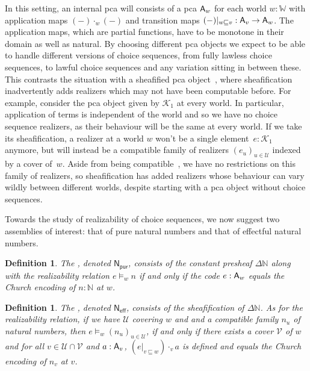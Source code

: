 \documentclass{easychair}
\newtheorem{defn}[thrm]{Definition}
\begin{document}
In this setting, an internal pca will consists of a pca \(\mathsf{A}_{w}\) for each
world \(w:\mathbb{W}\) with application maps \((-)\cdot_{w}(-)\) and transition
maps \((-)|_{w \sqsubseteq v} : \mathsf{A}_{v} \to \mathsf{A}_{w}\).
%
The application maps, which are partial functions, have to be monotone in their
domain as well as natural.
%
By choosing different pca objects we expect to be able to handle different
versions of choice sequences, from fully lawless choice sequences, to lawful
choice sequences and any variation sitting in between these.
%
This contrasts the situation with a sheafified pca
object~\cite{vanoostenSemanticalProofJonghs1991}, where sheafification
inadvertently adds realizers which may not have been computable before.
%
For example, consider the pca object given by \(\mathcal{K}_{1}\) at every
world.
%
In particular, application of terms is independent of the world and so we have
no choice sequence realizers, as their behaviour will be the same at every
world.
%
If we take its sheafification, a realizer at a world \(w\) won't be a single
element~\(e : \mathcal{K}_{1}\) anymore, but will instead be a compatible family
of realizers \({(e_{u})}_{u\in\mathcal{U}}\) indexed by a cover of~\(w\).
%
Aside from being compatible~\cite[Definition 2.1.2 in \S
C2.1]{johnstoneSketchesElephantTopos2002}, we have no restrictions on this
family of realizers, so sheafification has added realizers whose behaviour can
vary wildly between different worlds, despite starting with a pca object without
choice sequences.

Towards the study of realizability of choice sequences, we now suggest two
assemblies of interest: that of pure natural numbers and that of effectful
natural numbers.

\begin{defn}
  The , denoted
  \(\mathsf{N}_\mathsf{pur}\), consists of the constant presheaf
  \(\Delta\mathbb{N}\) along with the realizability relation \(e \vDash_{w} n\)
  if and only if the code \(e : \mathsf{A}_{w}\) equals the Church encoding of
  \(n : \mathbb{N}\) at \(w\).
\end{defn}

\begin{defn}
  The , denoted
  \(\mathsf{N}_\mathsf{eff}\), consists of the sheafification of \(\Delta\mathbb{N}\).
  As for the realizability relation, if we have \(\mathcal{U}\) covering \(w\)
  and and a compatible family \(n_{u}\) of natural numbers, then
  \(e \vDash_{w} {(n_{u})}_{u\in\mathcal{U}}\), if and only if there exists a
  cover \(\mathcal{V}\) of \(w\) and for all
  \(v \in \mathcal{U} \cap \mathcal{V}\) and \(a : \mathsf{A}_{v}\),
  \({(e|_{v \sqsubseteq w})} \cdot_{v} a\) is defined and equals the Church encoding of
  \(n_{v}\) at \(v\).
\end{defn}
\end{document}

